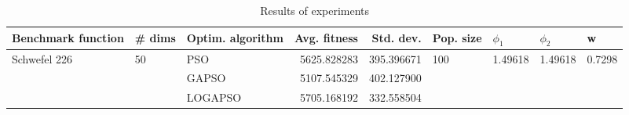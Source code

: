 \begin{table}
\centering
\caption{Results of experiments}
\begin{tabular}{lllrrllll}
\toprule
           Benchmark function &             \# dims & Optim. algorithm &  Avg. fitness &  Std. dev. &            Pop. size &               $\phi_{1}$ &               $\phi_{2}$ &                       w \\
\midrule
\multirow{3}{*}{Schwefel 226} & \multirow{3}{*}{50} &              PSO &   5625.828283 & 395.396671 & \multirow{3}{*}{100} & \multirow{3}{*}{1.49618} & \multirow{3}{*}{1.49618} & \multirow{3}{*}{0.7298} \\
                              &                     &            GAPSO &   5107.545329 & 402.127900 &                      &                          &                          &                         \\
                              &                     &          LOGAPSO &   5705.168192 & 332.558504 &                      &                          &                          &                         \\
\bottomrule
\end{tabular}
\end{table}
